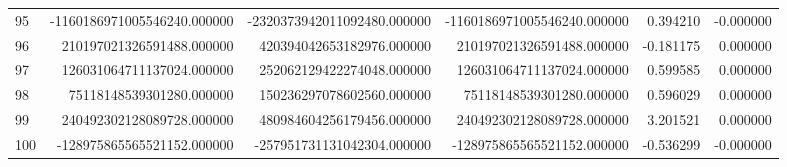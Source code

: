 \begin{tabular}{lrrrrr}
95 & -1160186971005546240.000000 & -2320373942011092480.000000 & -1160186971005546240.000000 & 0.394210 & -0.000000 \\
96 & 210197021326591488.000000 & 420394042653182976.000000 & 210197021326591488.000000 & -0.181175 & 0.000000 \\
97 & 126031064711137024.000000 & 252062129422274048.000000 & 126031064711137024.000000 & 0.599585 & 0.000000 \\
98 & 75118148539301280.000000 & 150236297078602560.000000 & 75118148539301280.000000 & 0.596029 & 0.000000 \\
99 & 240492302128089728.000000 & 480984604256179456.000000 & 240492302128089728.000000 & 3.201521 & 0.000000 \\
100 & -128975865565521152.000000 & -257951731131042304.000000 & -128975865565521152.000000 & -0.536299 & -0.000000 \\
\bottomrule
\end{tabular}
